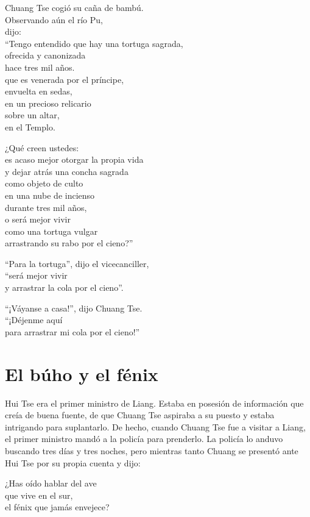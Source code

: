 \documentclass[book,b5paper,hidelinks,final]{memoir}
\begin{document}
	Chuang Tse cogió su caña de bambú.\\
	Observando aún el río Pu,\\
	dijo:\\
	``Tengo entendido que hay una tortuga sagrada,\\
	ofrecida y canonizada\\
	hace tres mil años.\\
	que es venerada por el príncipe,\\
	envuelta en sedas,\\
	en un precioso relicario\\
	sobre un altar,\\
	en el Templo.
	
	¿Qué creen ustedes:\\
	es acaso mejor otorgar la propia vida\\
	y dejar atrás una concha sagrada\\
	como objeto de culto\\
	en una nube de incienso\\
	durante tres mil años,\\
	o será mejor vivir\\
	como una tortuga vulgar\\
	arrastrando su rabo por el cieno?''
	
	``Para la tortuga'', dijo el vicecanciller,\\
	``será mejor vivir\\
	y arrastrar la cola por el cieno''.
	
	``¡Váyanse a casa!'', dijo Chuang Tse.\\
	``¡Déjenme aquí\\
	para arrastrar mi cola por el cieno!''
	
	\chapter*{El búho y el fénix}
	
	Hui Tse era el primer ministro de Liang. Estaba en posesión de
	información que creía de buena fuente, de que Chuang Tse aspiraba a su
	puesto y estaba intrigando para suplantarlo. De hecho, cuando Chuang Tse
	fue a visitar a Liang, el primer ministro mandó a la policía para
	prenderlo. La policía lo anduvo buscando tres días y tres noches, pero
	mientras tanto Chuang se presentó ante Hui Tse por su propia cuenta y
	dijo:
	
	¿Has oído hablar del ave\\
	que vive en el sur,\\
	el fénix que jamás envejece?
	
\end{document}
